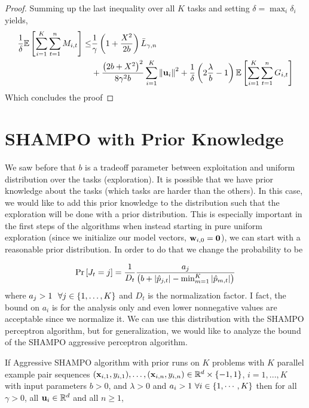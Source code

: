 {\begin{proof}
\noindent
Summing up the last inequality over all $K$ tasks and setting $\delta
= \max_i \delta_i$ yields,
\begin{equation*}
\begin{split}
\frac{1}{\delta}\mathbb{E}\left[ \sum_{i=1}^{K}\sum_{t=1}^{n}{M_{i,t}} \right]
\le&\frac{1}{\gamma}\left(1+\frac{X^2}{2b} \right){\bar L}_{\gamma,n}\\
&+\frac{\left({2b+X^2}\right)^2}{8{\gamma}^2b}\sum_{i=1}^{K}{{\left\Vert \mathbf{u}_{i} \right\Vert}^2}+ \frac{1}{\delta}\left({2\frac{\lambda}{b}-1}\right)\mathbb{E}\left[{\sum_{i=1}^{K}\sum_{t=1}^{n}{G_{i,t}}}\right]
\end{split}
\end{equation*}
Which concludes the proof
\QED
\end{proof}

\section{SHAMPO with Prior Knowledge}

We saw before that $b$ is a tradeoff parameter between  exploitation and uniform  distribution over the 
tasks (exploration). It is possible that we have prior knowledge about the tasks (which tasks are harder than 
the others). In this case, we would like to add this prior knowledge to the distribution such that the 
exploration will be done with a prior distribution. This is especially important in the first steps of the 
algorithms when instead starting in pure uniform exploration (since we initialize our model vectors, $\mathbf{w}_{i,0}={\boldsymbol{0}}$),  
we can start with a reasonable prior distribution.
In order to do that we change the probability to be 

\begin{equation*}
{\rm Pr}\left[{J_t=j}\right] =
\frac{1}{D_{t}}\frac{a_{j}}{\left({b+\left\vert{\hat{p}_{j,t}}\right\vert-\min_{m=1}^K\left\vert{\hat{p}_{m,t}}\right\vert}\right)} \end{equation*}
where $a_j>1~~\forall j\in\left\{{1,\ldots,K}\right\}$ and  $D_t$ is the normalization factor. 
I fact, the bound on $a_i$ is for the analysis only and even lower nonnegative 
values are acceptable since we normalize it.
We can use this distribution with the SHAMPO perceptron algorithm, but for generalization, we would like to analyze the 
bound of the SHAMPO aggressive perceptron algorithm. 

\begin{theorem}
  If Aggressive SHAMPO algorithm with prior runs on $K$ problems with $K$ parallel example pair
  sequences
  $(\mathbf{x}_{i,1},y_{i,1}),\ldots,(\mathbf{x}_{i,n},y_{i,n})\in\mathbb{R}^d\times\{-1,1\}$,
  $i=1,...,K$ with input parameters $b>0$, and $\lambda>0$  and $a_i>1~\forall i\in\left\{{1,\cdots,K}\right\}$ then for all $\gamma>0$, all
  $\mathbf{u}_{i}\in\mathbb{R}^d$ and all $n\ge1$,
  

\end{theorem}}
